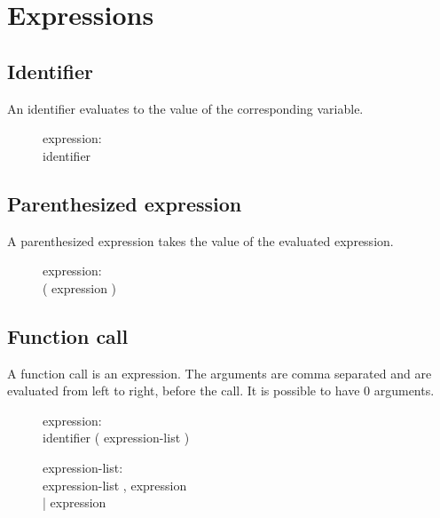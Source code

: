 \documentclass[12pt]{article}
\begin{document}
\section{Expressions}
\subsection{Identifier}
An identifier evaluates to the value of the corresponding variable.
\begin{description}
  \item[]expression: \hfill \\
    identifier
\end{description}

\subsection{Parenthesized expression}
A parenthesized expression takes the value of the evaluated expression.
\begin{description}
  \item[]expression: \hfill \\
    ( expression )
\end{description}

\subsection{Function call}
A function call is an expression. The arguments are comma separated and are evaluated
from left to right, before the call. It is possible to have 0 arguments.
\begin{description}
  \item[]expression: \hfill \\
    identifier ( expression-list )
\end{description}

\begin{description}
  \item[]expression-list: \hfill \\
    expression-list , expression \\
    | expression
\end{description}
\end{document}
